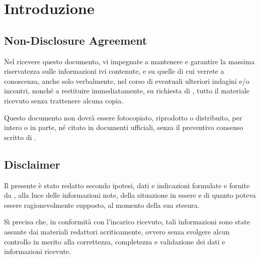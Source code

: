 \newcommand{\sharedPath}{../shared}
\newcommand{\doctitle}{Business Plan}











\section{Introduzione}

\subsection{Non-Disclosure Agreement}
Nel ricevere questo documento, vi impegnate a mantenere e garantire la massima riservatezza sulle informazioni ivi contenute, e su quelle di cui verrete a conoscenza, anche solo verbalmente, nel corso di eventuali ulteriori indagini e/o incontri, nonché a restituire immediatamente, su richiesta di \team, tutto il materiale ricevuto senza trattenere alcuna copia.

Questo documento non dovrà essere fotocopiato, riprodotto o distribuito, per intero o in parte, né citato in documenti ufficiali, senza il preventivo consenso scritto di \team.

\subsection{Disclaimer}
Il presente  è stato redatto secondo ipotesi, dati e indicazioni formulate e fornite da \customer, alla luce delle informazioni note, della situazione in essere e di quanto poteva essere ragionevolmente supposto, al momento della sua stesura.

Si precisa che, in conformità con l'incarico ricevuto, tali informazioni sono state assunte dai materiali redattori acriticamente, ovvero senza svolgere alcun controllo in merito alla correttezza, completezza e validazione dei dati e informazioni ricevute.


